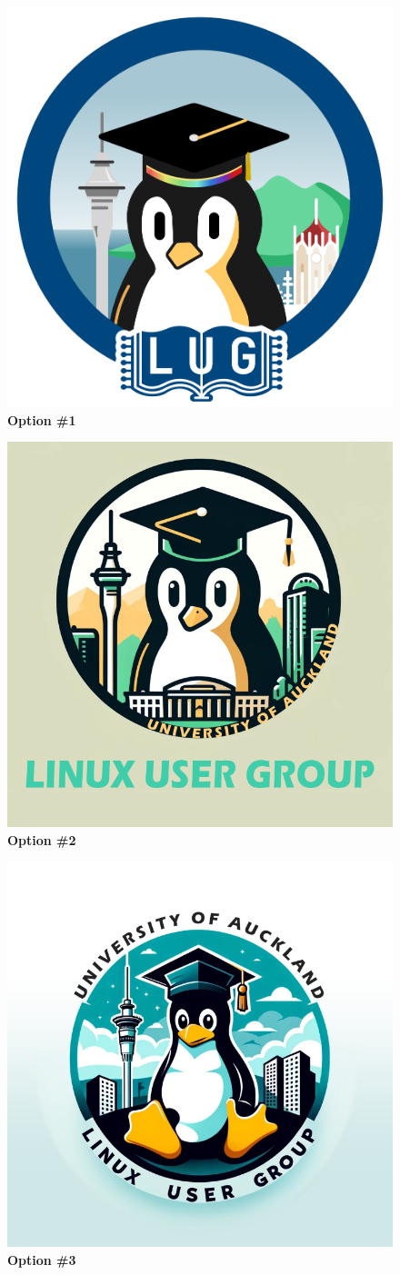 \documentclass[11pt,fleqn]{article}
\begin{document}
\pagecolor{LightGray}

\newpage


\begin{figure}
  \centering
  \includegraphics[width=0.56\linewidth]{res/1.png}
  \caption*{\Large{\textbf{Option \#1}}}
  \label{fig:optn1}
\end{figure}

\begin{figure}
  \centering
  \includegraphics[width=0.56\linewidth]{res/2.png}
  \caption*{\Large{\textbf{Option \#2}}}
  \label{fig:optn2}
\end{figure}

\begin{figure}
  \centering
  \includegraphics[width=0.56\linewidth]{res/3.png}
  \caption*{\Large{\textbf{Option \#3}}}
  \label{fig:optn3}
\end{figure}
\end{document}
